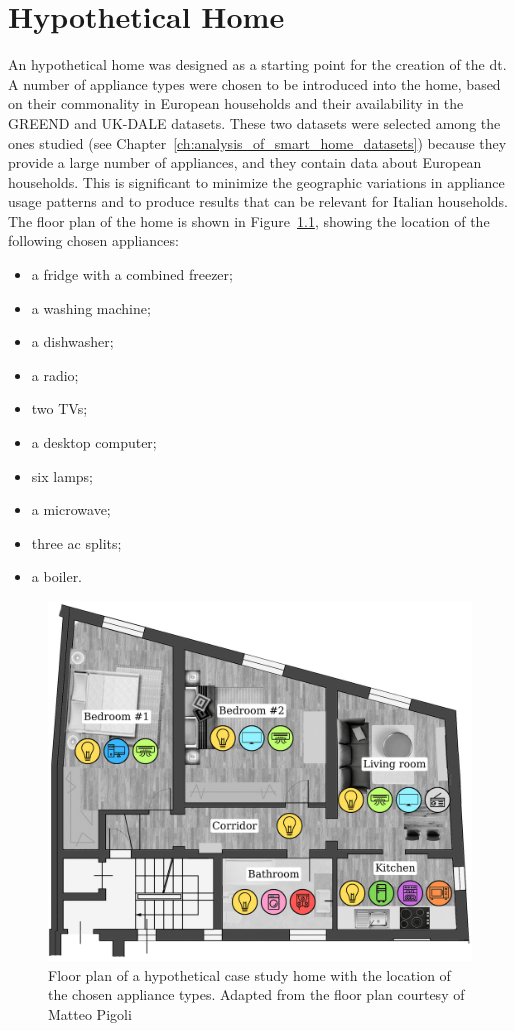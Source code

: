 \chapter{Hypothetical Home}\label{ch:hypothetical_home}

An hypothetical home was designed as a starting point for the creation of the \acrshort{dt}. A number of appliance types were chosen to be introduced into the home, based on their commonality in European households and their availability in the GREEND and UK-DALE datasets. These two datasets were selected among the ones studied (see Chapter~\ref{ch:analysis_of_smart_home_datasets}) because they provide a large number of appliances, and they contain data about European households. This is significant to minimize the geographic variations in appliance usage patterns and to produce results that can be relevant for Italian households. The floor plan of the home is shown in Figure~\ref{fig:home_floor_plan}, showing the location of the following chosen appliances:
\begin{itemize}
  \item a fridge with a combined freezer;
  \item a washing machine;
  \item a dishwasher;
  \item a radio;
  \item two TVs;
  \item a desktop computer;
  \item six lamps;
  \item a microwave;
  \item three \acrshort{ac} splits;
  \item a boiler.
\end{itemize}

\begin{figure}
  \centering
  \includegraphics[width=0.75\linewidth]{images/floor_plan.png}
  \caption[Floor plan of a hypothetical case study home with the location of the chosen appliance types]{Floor plan of a hypothetical case study home with the location of the chosen appliance types. Adapted from the floor plan courtesy of Matteo Pigoli}
  \label{fig:home_floor_plan}
\end{figure}

